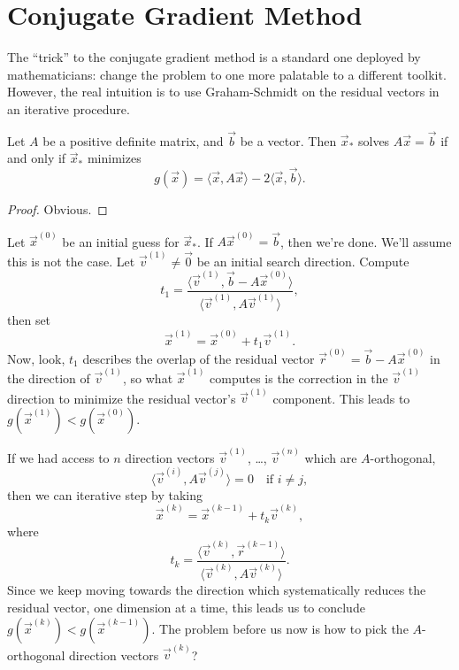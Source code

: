 \section{Conjugate Gradient Method}

The ``trick'' to the conjugate gradient method is a standard one
deployed by mathematicians: change the problem to one more palatable to
a different toolkit. However, the real intuition is to use
Graham-Schmidt on the residual vectors in an iterative procedure.

\begin{theorem}
Let $A$ be a positive definite matrix, and $\vec{b}$ be a vector.
Then $\vec{x}_{*}$ solves $A\vec{x}=\vec{b}$ if and only if
$\vec{x}_{*}$ minimizes
\begin{equation}
g(\vec{x})=\langle\vec{x},A\vec{x}\rangle-2\langle\vec{x},\vec{b}\rangle.
\end{equation}
\end{theorem}

\begin{proof}
Obvious.
\end{proof}

Let $\vec{x}^{(0)}$ be an initial guess for $\vec{x}_{*}$. If
$A\vec{x}^{(0)}=\vec{b}$, then we're done. We'll assume this is not the
case. Let
$\vec{v}^{(1)}\neq\vec{0}$ be an initial search direction. Compute
\begin{equation}
t_{1} = \frac{\langle\vec{v}^{(1)},\vec{b}-A\vec{x}^{(0)}\rangle}{\langle\vec{v}^{(1)},A\vec{v}^{(1)}\rangle},
\end{equation}
then set
\begin{equation}
\vec{x}^{(1)} = \vec{x}^{(0)}+t_{1}\vec{v}^{(1)}.
\end{equation}
Now, look, $t_{1}$ describes the overlap of the residual vector
$\vec{r}^{(0)}=\vec{b}-A\vec{x}^{(0)}$ in the direction of
$\vec{v}^{(1)}$, so what $\vec{x}^{(1)}$ computes is the correction in
the $\vec{v}^{(1)}$ direction to minimize the residual vector's
$\vec{v}^{(1)}$ component. This leads to
$g(\vec{x}^{(1)})<g(\vec{x}^{(0)})$.

If we had access to $n$ direction vectors $\vec{v}^{(1)}$, \dots,
$\vec{v}^{(n)}$ which are $A$-orthogonal,
\begin{equation}
\langle\vec{v}^{(i)},A\vec{v}^{(j)}\rangle=0\quad\mbox{if }i\neq j,
\end{equation}
then we can iterative step by taking
\begin{equation}
\vec{x}^{(k)} = \vec{x}^{(k-1)} + t_{k}\vec{v}^{(k)},
\end{equation}
where
\begin{equation}
t_{k} = \frac{\langle\vec{v}^{(k)},\vec{r}^{(k-1)}\rangle}{\langle\vec{v}^{(k)},A\vec{v}^{(k)}\rangle}.
\end{equation}
Since we keep moving towards the direction which systematically reduces
the residual vector, one dimension at a time, this leads us to conclude
$g(\vec{x}^{(k)})<g(\vec{x}^{(k-1)})$. 
The problem before us now is how to pick the $A$-orthogonal direction
vectors $\vec{v}^{(k)}$?

